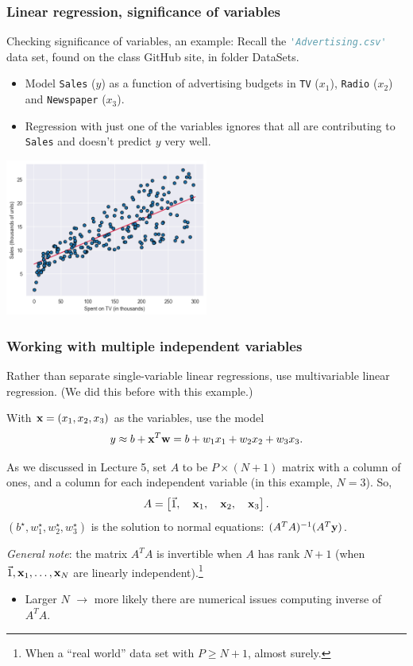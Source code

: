 \documentclass{beamer}
\theoremstyle{example}
\newcommand{\ct}[1]{\lstinline[language=Python,basicstyle=\ttfamily\footnotesize,stringstyle=\small\color{strings}]!#1!}
\newcommand{\ttt}[1]{{\small\texttt{#1}}}
\begin{document}
\begin{frame}
\frametitle{Linear regression, significance of variables}
{\color{mygreen}Checking significance of variables, an example:} Recall the \ct{'Advertising.csv'} data set, found on the class GitHub site, in folder DataSets.

\pause
\begin{itemize}
    \item Model \ttt{Sales} ($y$) as a function of advertising budgets in \ttt{TV} ($x_1$), \ttt{Radio} ($x_2$) and \ttt{Newspaper} ($x_3$).
    \pause
    \pause
    \item Regression with just one of the variables ignores that all are contributing to \ttt{Sales} and doesn't predict $y$ very well.
\end{itemize}
\centering 
\includegraphics[width=0.5\textwidth]{../../Images/advertising-plot1.png}

\end{frame}

\begin{frame}
\frametitle{Working with multiple independent variables}
    Rather than separate single-variable linear regressions, use multivariable linear regression. (We did this before with this example.)
\pause

    With ${\bf x} = (x_1,x_2,x_3)$ as the variables, use the model 
    \[y \approx b + {\bf x}^T{\bf w} = b + w_1x_1 + w_2x_2 + w_3x_3.\]

    \pause 
    As we discussed in Lecture 5, set $A$ to be $P\times(N+1)$ matrix with a column of ones, and a column for each independent variable (in this example, $N=3$). So, 
        \[A = \left[\vec{1}, \quad{\bf x}_1, \quad{\bf x}_2, \quad{\bf x}_3\right].\]
    $(b^\star, w_1^\star, w_2^\star, w_3^\star)$ is the solution to normal equations: $(A^TA)^{-1}(A^T{\bf y})$.

    \emph{General note}: the matrix $A^TA$ is invertible when $A$ has rank $N+1$ (when $\vec{1}, {\bf x}_1, \ldots, {\bf x}_N$ are linearly independent).\footnote{When a ``real world'' data set with $P\ge N+1$, almost surely.} 

    \pause
    \begin{itemize}
        \item Larger $N$ $\to$ more likely there are numerical issues computing inverse of $A^TA$.
    \end{itemize}
\end{frame}
\end{document}

